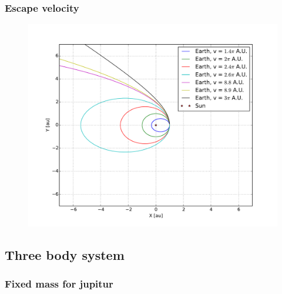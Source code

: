 
















\subsubsection{Escape velocity}


\begin{figure}[H]
    \centering
    \includegraphics[width=\linewidth]{result/bilder/escape-velocity.pdf}
    \caption{ }
    \label{fig:escape-velocity}
\end{figure}








\subsection{Three body system}

\subsubsection{Fixed mass for jupitur}


